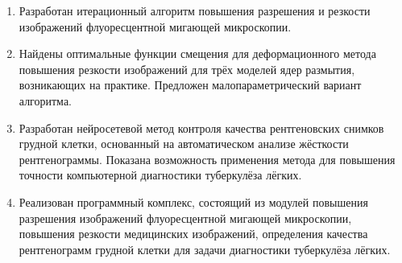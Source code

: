 \begin{enumerate}[beginpenalty=10000]
	\item Разработан итерационный алгоритм повышения разрешения и резкости изображений флуоресцентной мигающей микроскопии.
	
	\item Найдены оптимальные функции смещения для деформационного метода повышения резкости изображений для трёх моделей ядер размытия, возникающих на практике. Предложен малопараметрический вариант алгоритма.
	
	\item Разработан нейросетевой метод контроля качества рентгеновских снимков грудной клетки, основанный на автоматическом анализе жёсткости рентгенограммы. Показана возможность применения метода для повышения точности компьютерной диагностики туберкулёза лёгких.
	
	\item Реализован программный комплекс, состоящий из модулей повышения разрешения изображений флуоресцентной мигающей микроскопии, повышения резкости медицинских изображений, определения качества рентгенограмм грудной клетки для задачи диагностики туберкулёза лёгких.
\end{enumerate}

